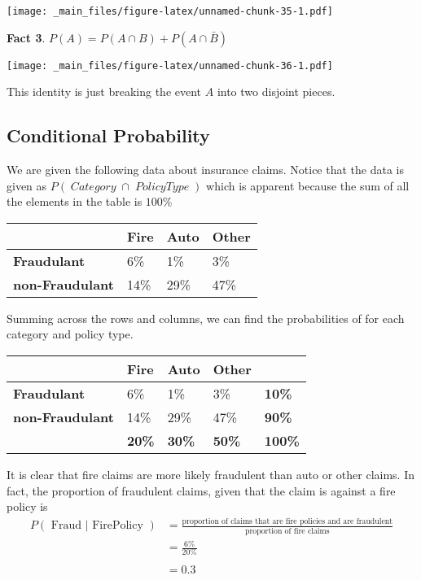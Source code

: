 \documentclass[]{book}
\begin{document}
\texttt{[image: \_main\_files/figure-latex/unnamed-chunk-35-1.pdf]}

\textbf{Fact 3}. \(P(A)=P(A\cap B)+P(A\cap\bar{B})\)

\texttt{[image: \_main\_files/figure-latex/unnamed-chunk-36-1.pdf]}

This identity is just breaking the event \(A\) into two disjoint pieces.

\subsection{Conditional Probability}\label{conditional-probability}

We are given the following data about insurance claims. Notice that the
data is given as \(P(\;Category\;\cap\;PolicyType\;)\) which is apparent
because the sum of all the elements in the table is \(100\%\)

\begin{longtable}[]{@{}llll@{}}
\toprule
\(\,\) & Fire & Auto & Other\tabularnewline
\midrule
\endhead
\textbf{Fraudulant} & 6\% & 1\% & 3\%\tabularnewline
\textbf{non-Fraudulant} & 14\% & 29\% & 47\%\tabularnewline
\bottomrule
\end{longtable}

Summing across the rows and columns, we can find the probabilities of
for each category and policy type.

\begin{longtable}[]{@{}lllll@{}}
\toprule
\(\,\) & Fire & Auto & Other & \(\,\)\tabularnewline
\midrule
\endhead
\textbf{Fraudulant} & 6\% & 1\% & 3\% & \textbf{10\%}\tabularnewline
\textbf{non-Fraudulant} & 14\% & 29\% & 47\% &
\textbf{90\%}\tabularnewline
\(\,\) & \textbf{20\%} & \textbf{30\%} & \textbf{50\%} &
\textbf{100\%}\tabularnewline
\bottomrule
\end{longtable}

It is clear that fire claims are more likely fraudulent than auto or
other claims. In fact, the proportion of fraudulent claims, given that
the claim is against a fire policy is \[\begin{aligned}
P(\textrm{ Fraud }|\textrm{ FirePolicy })   &=  \frac{\textrm{proportion of claims that are fire policies and are fraudulent}}{\textrm{proportion of fire claims}} \\
    &=  \frac{6\%}{20\%}\\
    & \\
    &=  0.3
    \end{aligned}\]
\end{document}
